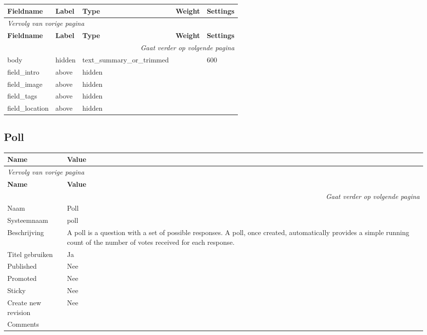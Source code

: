   \begin{longtable}{| p{3.00cm}|p{3.00cm}|p{3.00cm}|p{3.00cm}|p{3.00cm}|}
  \hline
  \rowcolor{tableheader}
  \textbf{Fieldname} & \textbf{Label} & \textbf{Type} & \textbf{Weight} & \textbf{Settings}  \tabularnewline
  \hline
\endfirsthead
\multicolumn{5}{l}{\textit{Vervolg van vorige pagina}} \\
\hline
\rowcolor{tableheader}
  \textbf{Fieldname} & \textbf{Label} & \textbf{Type} & \textbf{Weight} & \textbf{Settings}  \tabularnewline
  \hline
\hline
\endhead
\multicolumn{5}{r}{\textit{Gaat verder op volgende pagina}} \\
\endfoot
\hline
\endlastfoot
  body & hidden & text\_summary\_or\_trimmed &   & 600  \tabularnewline
  \hline
  field\_intro & above & hidden &   &    \tabularnewline
  \hline
  field\_image & above & hidden &   &    \tabularnewline
  \hline
  field\_tags & above & hidden &   &    \tabularnewline
  \hline
  field\_location & above & hidden &   &    \tabularnewline
  \hline
  \end{longtable}

\subsection{Poll}
\label{sec:content-poll}
  \begin{longtable}{| p{7.50cm}|p{7.50cm}|}
  \hline
  \rowcolor{tableheader}
  \textbf{Name} & \textbf{Value}  \tabularnewline
  \hline
\endfirsthead
\multicolumn{2}{l}{\textit{Vervolg van vorige pagina}} \\
\hline
\rowcolor{tableheader}
  \textbf{Name} & \textbf{Value}  \tabularnewline
  \hline
\hline
\endhead
\multicolumn{2}{r}{\textit{Gaat verder op volgende pagina}} \\
\endfoot
\hline
\endlastfoot
  Naam & Poll  \tabularnewline
  \hline
  Systeemnaam & poll  \tabularnewline
  \hline
  Beschrijving & A poll is a question with a set of possible responses. A poll, once created, automatically provides a simple running count of the number of votes received for each response.  \tabularnewline
  \hline
  Titel gebruiken & Ja  \tabularnewline
  \hline
  Published & Nee  \tabularnewline
  \hline
  Promoted & Nee  \tabularnewline
  \hline
  Sticky & Nee  \tabularnewline
  \hline
  Create new revision & Nee  \tabularnewline
  \hline
  Comments &   \tabularnewline
  \hline
  \end{longtable}

